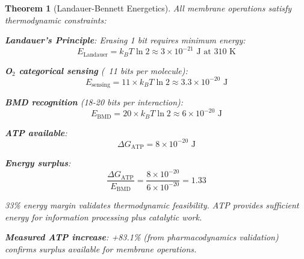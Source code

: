 \documentclass[11pt,a4paper]{article}
\newtheorem{theorem}{Theorem}[section]
\theoremstyle{definition}
\theoremstyle{remark}
\begin{document}
\begin{theorem}[Landauer-Bennett Energetics]
All membrane operations satisfy thermodynamic constraints:

\textbf{Landauer's Principle}: Erasing 1 bit requires minimum energy:
\begin{equation}
E_{\text{Landauer}} = k_B T \ln 2 \approx 3 \times 10^{-21} \text{ J at 310 K}
\end{equation}

\textbf{O$_2$ categorical sensing} (~11 bits per molecule):
\begin{equation}
E_{\text{sensing}} = 11 \times k_B T \ln 2 \approx 3.3 \times 10^{-20} \text{ J}
\end{equation}

\textbf{BMD recognition} (18-20 bits per interaction):
\begin{equation}
E_{\text{BMD}} = 20 \times k_B T \ln 2 \approx 6 \times 10^{-20} \text{ J}
\end{equation}

\textbf{ATP available}:
\begin{equation}
\Delta G_{\text{ATP}} = 8 \times 10^{-20} \text{ J}
\end{equation}

\textbf{Energy surplus}: 
\begin{equation}
\frac{\Delta G_{\text{ATP}}}{E_{\text{BMD}}} = \frac{8 \times 10^{-20}}{6 \times 10^{-20}} = 1.33
\end{equation}

33\% energy margin validates thermodynamic feasibility. ATP provides sufficient energy for information processing plus catalytic work.

\textbf{Measured ATP increase}: +83.1\% (from pharmacodynamics validation) confirms surplus available for membrane operations.
\end{theorem}
\end{document}
